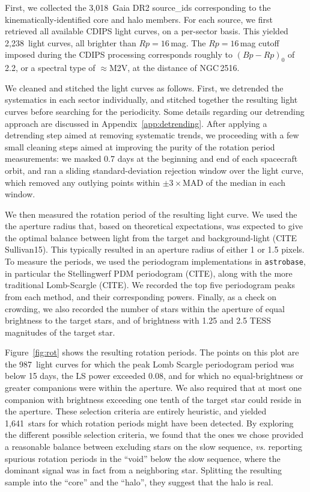 \documentclass[12pt,twocolumn,tighten]{aastex63}
\newcommand{\nkinematic}{3{,}018\ } %
\newcommand{\ncdips}{2,238\ } %
\newcommand{\nautorotdenominator}{1{,}641\ } %
\newcommand{\nautorotnumerator}{987\ } %
\begin{document}
First, we collected the \nkinematic Gaia DR2 source\_ids corresponding to the
kinematically-identified core and halo members.  For each source, we first retrieved all
available CDIPS light curves, on a per-sector basis. 
This yielded
\ncdips light curves, all brighter than $Rp=16$\,mag.
The $Rp=16$\,mag cutoff imposed during the CDIPS processing corresponds
roughly to $(Bp-Rp)_0$ of 2.2, or a spectral type of $\approx$M2V, at
the distance of NGC\,2516.

We cleaned and stitched the light curves as follows.
First, we detrended the systematics in each sector individually, and
stitched together the resulting light curves before searching for the
periodicity.  Some details regarding our detrending approach are
discussed in Appendix~\ref{app:detrending}.  After applying a
detrending step aimed at removing systematic trends, we proceeding
with a few small cleaning steps aimed at improving the purity of the
rotation period measurements: we masked 0.7 days at the beginning and
end of each spacecraft orbit, and ran a sliding standard-deviation
rejection window over the light curve, which removed any outlying
points within $\pm3\times$MAD of the median in each window.

We then measured the rotation period of the resulting light curve.  We
used the the aperture radius that, based on theoretical expectations,
was expected to give the optimal balance between light from the target
and background-light (CITE Sullivan15).  This typically resulted in an
aperture radius of either 1 or 1.5 pixels.  To measure the periods, we
used the periodogram implementations in \texttt{astrobase}, in
particular the Stellingwerf PDM periodogram (CITE), along with the
more traditional Lomb-Scargle (CITE).  We recorded the top five
periodogram peaks from each method, and their corresponding powers.
Finally, as a check on crowding, we also recorded the number of stars
within the aperture of equal brightness to the target stars, and of
brightness with 1.25 and 2.5 TESS magnitudes of the target star.

Figure~\ref{fig:rot} shows the resulting rotation periods.  The points
on this plot are the \nautorotnumerator light curves for which the peak Lomb Scargle
periodogram period was below 15 days, the LS power exceeded 0.08, and
for which no equal-brightness or greater companions were within the aperture. 
We also required that at most one companion with brightness exceeding 
one tenth of the target star could reside in the aperture.
These
selection criteria are entirely heuristic, and yielded
\nautorotdenominator stars for which rotation periods might have been
detected.  
By exploring the different possible selection criteria, we found that
the ones we chose provided a
reasonable balance between excluding stars on the slow sequence, {\it
vs.} reporting spurious rotation periods in the ``void'' below the
slow sequence, where the dominant signal was in fact from a
neighboring star.
Splitting the resulting sample into the ``core'' and the ``halo'', they
suggest that the halo is real.
\end{document}
